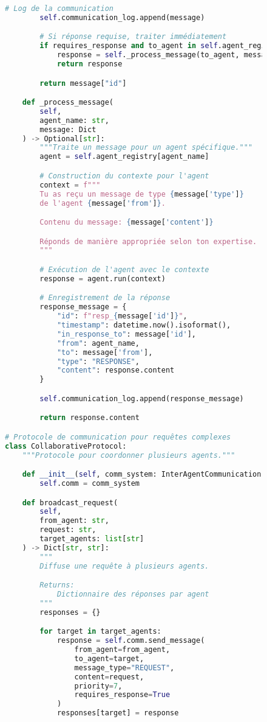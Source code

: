 \begin{figure}[h]
\begin{lstlisting}[language=Python, caption=Architecture de communication inter-agents]
        # Log de la communication
        self.communication_log.append(message)

        # Si réponse requise, traiter immédiatement
        if requires_response and to_agent in self.agent_registry:
            response = self._process_message(to_agent, message)
            return response

        return message["id"]

    def _process_message(
        self,
        agent_name: str,
        message: Dict
    ) -> Optional[str]:
        """Traite un message pour un agent spécifique."""
        agent = self.agent_registry[agent_name]

        # Construction du contexte pour l'agent
        context = f"""
        Tu as reçu un message de type {message['type']}
        de l'agent {message['from']}.

        Contenu du message: {message['content']}

        Réponds de manière appropriée selon ton expertise.
        """

        # Exécution de l'agent avec le contexte
        response = agent.run(context)

        # Enregistrement de la réponse
        response_message = {
            "id": f"resp_{message['id']}",
            "timestamp": datetime.now().isoformat(),
            "in_response_to": message['id'],
            "from": agent_name,
            "to": message['from'],
            "type": "RESPONSE",
            "content": response.content
        }

        self.communication_log.append(response_message)

        return response.content

# Protocole de communication pour requêtes complexes
class CollaborativeProtocol:
    """Protocole pour coordonner plusieurs agents."""

    def __init__(self, comm_system: InterAgentCommunication):
        self.comm = comm_system

    def broadcast_request(
        self,
        from_agent: str,
        request: str,
        target_agents: list[str]
    ) -> Dict[str, str]:
        """
        Diffuse une requête à plusieurs agents.

        Returns:
            Dictionnaire des réponses par agent
        """
        responses = {}

        for target in target_agents:
            response = self.comm.send_message(
                from_agent=from_agent,
                to_agent=target,
                message_type="REQUEST",
                content=request,
                priority=7,
                requires_response=True
            )
            responses[target] = response


\end{lstlisting}
\end{figure}
